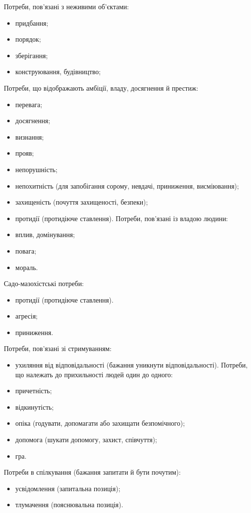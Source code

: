 \documentclass[a4paper,14pt]{extreport}
\begin{document}
Потреби, пов'язані з неживими об'єктами:
\begin{itemize}
\item придбання;
\item порядок;
\item зберігання;
\item конструювання, будівництво;
\end{itemize}
Потреби, що відображають амбіції, владу, досягнення й престиж:
\begin{itemize}
\item перевага;
\item досягнення;
\item визнання;
\item прояв;
\item непорушність;
\item непохитність (для запобігання сорому, невдачі, приниження, висміювання);
\item захищеність (почуття захищеності, безпеки);
\item протидії (протидіюче ставлення). Потреби, пов'язані із владою людини:
\item вплив, домінування;
\item повага;
\item мораль.
\end{itemize}
Садо-мазохістські потреби:
\begin{itemize}
\item протидії (протидіюче ставлення).
\item агресія;
\item приниження.
\end{itemize}
Потреби, пов'язані зі стримуванням:
\begin{itemize}
\item ухиляння від відповідальності (бажання уникнути відповідальності). Потреби, що належать до прихильності людей один до одного:
\item причетність;
\item відкинутість;
\item опіка (годувати, допомагати або захищати безпомічного);
\item допомога (шукати допомогу, захист, співчуття);
\item гра.
\end{itemize}
Потреби в спілкування (бажання запитати й бути почутим):
\begin{itemize}
\item усвідомлення (запитальна позиція);
\item тлумачення (пояснювальна позиція).
\end{itemize}
\end{document}
